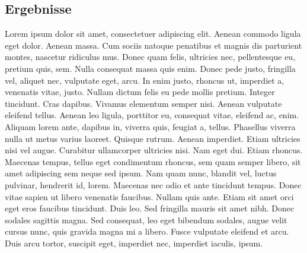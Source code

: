 \documentclass[a1paper]{article}
\begin{document}
\newpage

\begin{posterbox}
	\vspace{-10mm}
	\raggedright

	\section*{Ergebnisse}
	Lorem ipsum dolor sit amet, consectetuer adipiscing elit. Aenean commodo ligula eget dolor. Aenean massa. Cum sociis natoque penatibus et magnis dis parturient montes, nascetur ridiculus mus. Donec quam felis, ultricies nec, pellentesque eu, pretium quis, sem. Nulla consequat massa quis enim. Donec pede justo, fringilla vel, aliquet nec, vulputate eget, arcu. In enim justo, rhoncus ut, imperdiet a, venenatis vitae, justo. Nullam dictum felis eu pede mollis pretium. Integer tincidunt. Cras dapibus. Vivamus elementum semper nisi. Aenean vulputate eleifend tellus. Aenean leo ligula, porttitor eu, consequat vitae, eleifend ac, enim. Aliquam lorem ante, dapibus in, viverra quis, feugiat a, tellus. Phasellus viverra nulla ut metus varius laoreet. Quisque rutrum. Aenean imperdiet. Etiam ultricies nisi vel augue. Curabitur ullamcorper ultricies nisi. Nam eget dui. Etiam rhoncus. Maecenas tempus, tellus eget condimentum rhoncus, sem quam semper libero, sit amet adipiscing sem neque sed ipsum. Nam quam nunc, blandit vel, luctus pulvinar, hendrerit id, lorem. Maecenas nec odio et ante tincidunt tempus. Donec vitae sapien ut libero venenatis faucibus. Nullam quis ante. Etiam sit amet orci eget eros faucibus tincidunt. Duis leo. Sed fringilla mauris sit amet nibh. Donec sodales sagittis magna. Sed consequat, leo eget bibendum sodales, augue velit cursus nunc, quis gravida magna mi a libero. Fusce vulputate eleifend et arcu. Duis arcu tortor, suscipit eget, imperdiet nec, imperdiet iaculis, ipsum.
\end{posterbox}

\vfill
\end{document}
